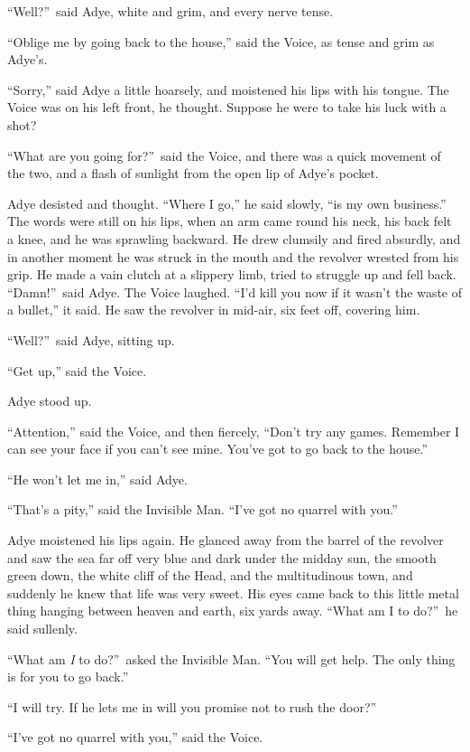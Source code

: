“Well?”\ said Adye, white and grim, and every nerve tense.

“Oblige me by going back to the house,” said the Voice, as tense and grim as Adye’s.

“Sorry,” said Adye a little hoarsely, and moistened his lips with his tongue. The Voice was on his left front, he thought. Suppose he were to take his luck with a shot?

“What are you going for?”\ said the Voice, and there was a quick movement of the two, and a flash of sunlight from the open lip of Adye’s pocket.

Adye desisted and thought. “Where I go,” he said slowly, “is my own business.” The words were still on his lips, when an arm came round his neck, his back felt a knee, and he was sprawling backward. He drew clumsily and fired absurdly, and in another moment he was struck in the mouth and the revolver wrested from his grip. He made a vain clutch at a slippery limb, tried to struggle up and fell back. “Damn!”\ said Adye. The Voice laughed. “I’d kill you now if it wasn’t the waste of a bullet,” it said. He saw the revolver in mid-air, six feet off, covering him.

“Well?”\ said Adye, sitting up.

“Get up,” said the Voice.

Adye stood up.

“Attention,” said the Voice, and then fiercely, “Don’t try any games. Remember I can see your face if you can’t see mine. You’ve got to go back to the house.”

“He won’t let me in,” said Adye.

“That’s a pity,” said the Invisible Man. “I’ve got no quarrel with you.”

Adye moistened his lips again. He glanced away from the barrel of the revolver and saw the sea far off very blue and dark under the midday sun, the smooth green down, the white cliff of the Head, and the multitudinous town, and suddenly he knew that life was very sweet. His eyes came back to this little metal thing hanging between heaven and earth, six yards away. “What am I to do?”\ he said sullenly.

“What am \emph{I} to do?”\ asked the Invisible Man. “You will get help. The only thing is for you to go back.”

“I will try. If he lets me in will you promise not to rush the door?”

“I’ve got no quarrel with you,” said the Voice.

